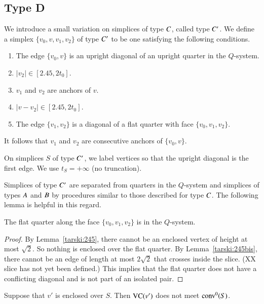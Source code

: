 \subsection{Type D}%

We introduce a small variation on simplices of type $C$, called
type $C' $.  We define a simplex $\{v_0,v,v_1,v_2\}$ of type $C' $
to be one satisfying the following conditions.
    \begin{enumerate}
    \item The edge $\{v_0,v\}$ is an upright diagonal of an upright quarter
        in the $Q$-system.
    \item $|v_2|\in[2.45,2t_0]$.
    \item $v_1$ and $v_2$ are anchors of $v$.
    \item $|v-v_2|\in [2.45,2t_0]$.
    \item The edge $\{v_1,v_2\}$
    is a diagonal of a flat quarter with face $\{v_0,v_1,v_2\}$.
    \end{enumerate}

It follows that $v_1$ and $v_2$ are consecutive anchors of
$\{v_0,v\}$.

On simplices $S$ of type $C' $, we label vertices so that the
upright diagonal is the first edge.  We use $t_S=+\infty$ (no
truncation).  

Simplices of type $C' $ are separated from quarters in the
$Q$-system and simplices of types $A$ and $B$ by procedures
similar to those described for type $C$.  The following lemma is
helpful in this regard.


\begin{lemma}\label{lemma:C'Q}
 The flat quarter along the face $\{v_0,v_1,v_2\}$ is
in the $Q$-system.
\end{lemma}

\begin{proof}
By Lemma~\ref{tarski:245}, there cannot be an enclosed vertex
of height at most $\sqrt2$. 
So nothing is enclosed over the flat quarter.
By Lemma~\ref{tarski:245bis}, there cannot be an edge of length
at most $2\sqrt2$ that crosses inside the slice.
(XX slice has not yet been defined.) 
This implies that the flat quarter does not have
a conflicting diagonal and is not part of an isolated pair.
\end{proof}


\begin{lemma}
Suppose that $v'$ is enclosed over $S$.  Then ${\operatorname{VC}}(v')$ does
not meet ${\operatorname{conv}}^0(S)$.
\end{lemma}

